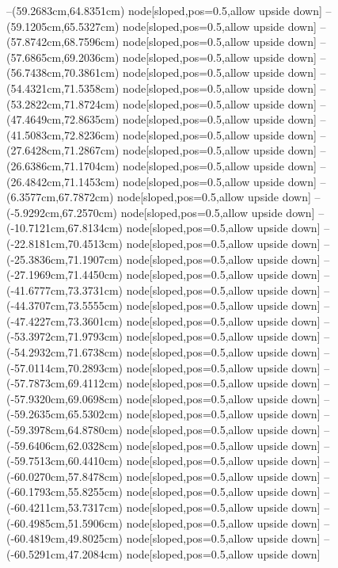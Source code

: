 --(59.2683cm,64.8351cm) node[sloped,pos=0.5,allow upside down]{\ArrowIn}
--(59.1205cm,65.5327cm) node[sloped,pos=0.5,allow upside down]{\arrowIn}
--(57.8742cm,68.7596cm) node[sloped,pos=0.5,allow upside down]{\ArrowIn}
--(57.6865cm,69.2036cm) node[sloped,pos=0.5,allow upside down]{\arrowIn}
--(56.7438cm,70.3861cm) node[sloped,pos=0.5,allow upside down]{\ArrowIn}
--(54.4321cm,71.5358cm) node[sloped,pos=0.5,allow upside down]{\ArrowIn}
--(53.2822cm,71.8724cm) node[sloped,pos=0.5,allow upside down]{\ArrowIn}
--(47.4649cm,72.8635cm) node[sloped,pos=0.5,allow upside down]{\ArrowIn}
--(41.5083cm,72.8236cm) node[sloped,pos=0.5,allow upside down]{\ArrowIn}
--(27.6428cm,71.2867cm) node[sloped,pos=0.5,allow upside down]{\ArrowIn}
--(26.6386cm,71.1704cm) node[sloped,pos=0.5,allow upside down]{\ArrowIn}
--(26.4842cm,71.1453cm) node[sloped,pos=0.5,allow upside down]{\arrowIn}
--(6.3577cm,67.7872cm) node[sloped,pos=0.5,allow upside down]{\ArrowIn}
--(-5.9292cm,67.2570cm) node[sloped,pos=0.5,allow upside down]{\ArrowIn}
--(-10.7121cm,67.8134cm) node[sloped,pos=0.5,allow upside down]{\ArrowIn}
--(-22.8181cm,70.4513cm) node[sloped,pos=0.5,allow upside down]{\ArrowIn}
--(-25.3836cm,71.1907cm) node[sloped,pos=0.5,allow upside down]{\ArrowIn}
--(-27.1969cm,71.4450cm) node[sloped,pos=0.5,allow upside down]{\ArrowIn}
--(-41.6777cm,73.3731cm) node[sloped,pos=0.5,allow upside down]{\ArrowIn}
--(-44.3707cm,73.5555cm) node[sloped,pos=0.5,allow upside down]{\ArrowIn}
--(-47.4227cm,73.3601cm) node[sloped,pos=0.5,allow upside down]{\ArrowIn}
--(-53.3972cm,71.9793cm) node[sloped,pos=0.5,allow upside down]{\ArrowIn}
--(-54.2932cm,71.6738cm) node[sloped,pos=0.5,allow upside down]{\arrowIn}
--(-57.0114cm,70.2893cm) node[sloped,pos=0.5,allow upside down]{\ArrowIn}
--(-57.7873cm,69.4112cm) node[sloped,pos=0.5,allow upside down]{\ArrowIn}
--(-57.9320cm,69.0698cm) node[sloped,pos=0.5,allow upside down]{\arrowIn}
--(-59.2635cm,65.5302cm) node[sloped,pos=0.5,allow upside down]{\ArrowIn}
--(-59.3978cm,64.8780cm) node[sloped,pos=0.5,allow upside down]{\arrowIn}
--(-59.6406cm,62.0328cm) node[sloped,pos=0.5,allow upside down]{\ArrowIn}
--(-59.7513cm,60.4410cm) node[sloped,pos=0.5,allow upside down]{\ArrowIn}
--(-60.0270cm,57.8478cm) node[sloped,pos=0.5,allow upside down]{\ArrowIn}
--(-60.1793cm,55.8255cm) node[sloped,pos=0.5,allow upside down]{\ArrowIn}
--(-60.4211cm,53.7317cm) node[sloped,pos=0.5,allow upside down]{\ArrowIn}
--(-60.4985cm,51.5906cm) node[sloped,pos=0.5,allow upside down]{\ArrowIn}
--(-60.4819cm,49.8025cm) node[sloped,pos=0.5,allow upside down]{\ArrowIn}
--(-60.5291cm,47.2084cm) node[sloped,pos=0.5,allow upside down]{\ArrowIn}
